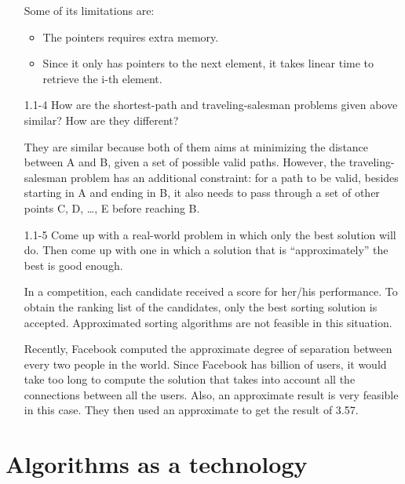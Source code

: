 \begin{enumerate}
\begin{framed}
Some of its limitations are:

\begin{itemize}
\item The pointers requires extra memory.
\item Since it only has pointers to the next element, it takes linear time to
  retrieve the i-th element.
\end{itemize}
\end{framed}

\item[1.1{-}4] How are the shortest-path and traveling-salesman problems
  given above similar? How are they different?

\begin{framed}
They are similar because both of them aims at minimizing the distance between
A and B, given a set of possible valid paths. However, the traveling-salesman
problem has an additional constraint: for a path to be valid, besides starting
in A and ending in B, it also needs to pass through a set of other points C, D,
\ldots, E before reaching B.
\end{framed}

\item[1.1{-}5] Come up with a real-world problem in which only the best
  solution will do. Then come up with one in which a solution that is
  ``approximately'' the best is good enough.

\begin{framed}
In a competition, each candidate received a score for her/his performance. To
obtain the ranking list of the candidates, only the best sorting solution is
accepted. Approximated sorting algorithms are not feasible in this situation.

Recently, Facebook computed the approximate degree of separation between every
two people in the world. Since Facebook has billion of users, it would take too
long to compute the solution that takes into account all the connections between
all the users. Also, an approximate result is very feasible in this case. They
then used an approximate to get the result of 3.57.
\end{framed}

\end{enumerate}

\pagebreak

\section{Algorithms as a technology}

